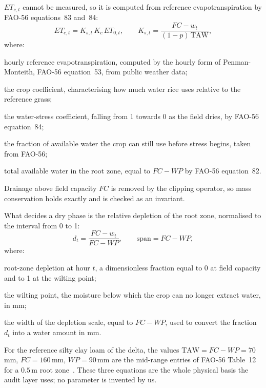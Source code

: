 $ET_{c,t}$ cannot be measured, so it is computed from reference
evapotranspiration by FAO-56 equations~83 and~84:
\begin{equation}
ET_{c,t}=K_{s,t}\,K_c\,ET_{0,t},
\qquad
K_{s,t}=\frac{FC-w_t}{(1-p)\,\mathrm{TAW}},
\label{eq:etc}
\end{equation}
where:
\begin{symbolist}
\item[$ET_{0,t}$] hourly reference evapotranspiration, computed by the hourly form
  of Penman-Monteith, FAO-56 equation~53, from public weather data;
\item[$K_c$] the crop coefficient, characterising how much water rice uses relative
  to the reference grass;
\item[$K_{s,t}$] the water-stress coefficient, falling from 1 towards 0 as the
  field dries, by FAO-56 equation~84;
\item[$p$] the fraction of available water the crop can still use before stress
  begins, taken from FAO-56;
\item[$\mathrm{TAW}$] total available water in the root zone, equal to $FC-WP$ by
  FAO-56 equation~82.
\end{symbolist} Drainage above field capacity $FC$ is removed by the clipping operator, so mass
conservation holds exactly and is checked as an invariant.

What decides a dry phase is the relative depletion of the root zone, normalised to the
interval from 0 to 1:
\begin{equation}
d_t=\frac{FC-w_t}{FC-WP},\qquad \mathrm{span}=FC-WP,
\label{eq:depl}
\end{equation}
where:
\begin{symbolist}
\item[$d_t$] root-zone depletion at hour $t$, a dimensionless fraction equal to 0 at
  field capacity and to 1 at the wilting point;
\item[$WP$] the wilting point, the moisture below which the crop can no longer
  extract water, in mm;
\item[$\mathrm{span}$] the width of the depletion scale, equal to $FC-WP$, used to
  convert the fraction $d_t$ into a water amount in mm.
\end{symbolist}

For the reference silty clay loam of the delta, the values
$\mathrm{TAW}=FC-WP=70$\,mm, $FC=160$\,mm, $WP=90$\,mm are the mid-range entries
of FAO-56 Table~12 for a $0.5$\,m root zone~\cite{fao56}. These three equations are
the whole physical basis the audit layer uses; no parameter is invented by us.

